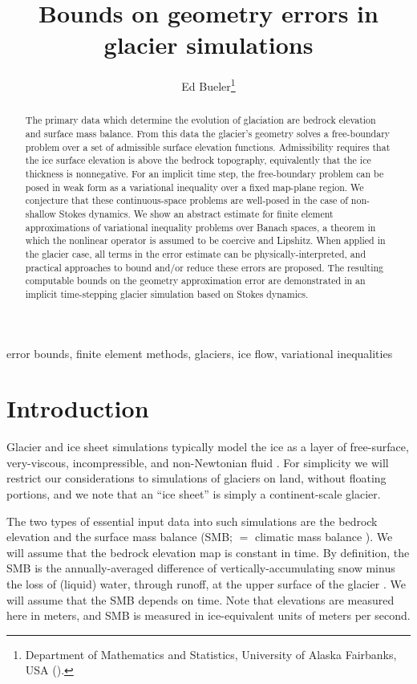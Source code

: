 \documentclass[hidelinks,onefignum,onetabnum,final]{siamart220329}  %
\title{Bounds on geometry errors in glacier simulations}
\author{Ed Bueler\thanks{Department of Mathematics and Statistics, University of Alaska Fairbanks, USA (\email{elbueler@alaska.edu}).}}
\begin{document}
\maketitle

\begin{abstract}
The primary data which determine the evolution of glaciation are bedrock elevation and surface mass balance.  From this data the glacier's geometry solves a free-boundary problem over a set of admissible surface elevation functions.  Admissibility requires that the ice surface elevation is above the bedrock topography, equivalently that the ice thickness is nonnegative.  For an implicit time step, the free-boundary problem can be posed in weak form as a variational inequality over a fixed map-plane region.  We conjecture that these continuous-space problems are well-posed in the case of non-shallow Stokes dynamics.  We show an abstract estimate for finite element approximations of variational inequality problems over Banach spaces, a theorem in which the nonlinear operator is assumed to be coercive and Lipshitz.  When applied in the glacier case, all terms in the error estimate can be physically-interpreted, and practical approaches to bound and/or reduce these errors are proposed.  The resulting computable bounds on the geometry approximation error are demonstrated in an implicit time-stepping glacier simulation based on Stokes dynamics.
\end{abstract}

\begin{keywords}
error bounds, finite element methods, glaciers, ice flow, variational inequalities
\end{keywords}



\section{Introduction} \label{sec:intro}

Glacier and ice sheet simulations typically model the ice as a layer of free-surface, very-viscous, incompressible, and non-Newtonian fluid \cite{GreveBlatter2009,SchoofHewitt2013}.  For simplicity we will restrict our considerations to simulations of glaciers on land, without floating portions, and we note that an ``ice sheet'' is simply a continent-scale glacier.

The two types of essential input data into such simulations are the bedrock elevation and the surface mass balance (SMB; $=$ climatic mass balance \cite{Cogleyetal2011}).  We will assume that the bedrock elevation map is constant in time.  By definition, the SMB is the annually-averaged difference of vertically-accumulating snow minus the loss of (liquid) water, through runoff, at the upper surface of the glacier \cite{Cogleyetal2011}.  We will assume that the SMB depends on time.  Note that elevations are measured here in meters, and SMB is measured in ice-equivalent units of meters per second.
\end{document}
